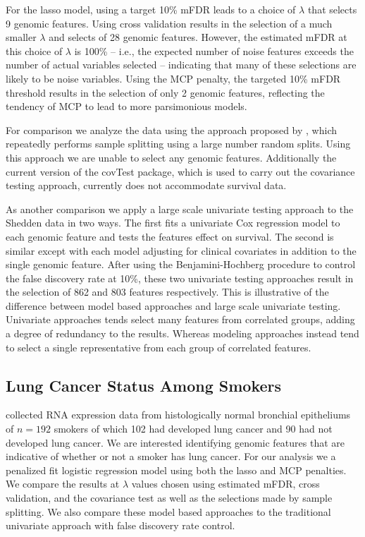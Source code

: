 For the lasso model, using a target 10\% mFDR leads to a choice of $\lambda$ that selects 9 genomic features. Using cross validation results in the selection of a much smaller $\lambda$ and selects of 28 genomic features.  However, the estimated mFDR at this choice of $\lambda$ is 100\% -- i.e., the expected number of noise features exceeds the number of actual variables selected -- indicating that many of these selections are likely to be noise variables.  Using the MCP penalty, the targeted 10\% mFDR threshold results in the selection of only 2 genomic features, reflecting the tendency of MCP to lead to more parsimonious models.


For comparison we analyze the data using the approach proposed by \citet{Meinshausen2009}, which repeatedly performs sample splitting using a large number random splits. Using this approach we are unable to select any genomic features. Additionally the current version of the covTest package, which is used to carry out the covariance testing approach, currently does not accommodate survival data.

As another comparison we apply a large scale univariate testing approach to the Shedden data in two ways. The first fits a univariate Cox regression model to each genomic feature and tests the features effect on survival.  The second is similar except with each model adjusting for clinical covariates in addition to the single genomic feature.  After using the Benjamini-Hochberg procedure to control the false discovery rate at 10\%, these two univariate testing approaches result in the selection of 862 and 803 features respectively. This is illustrative of the difference between model based approaches and large scale univariate testing. Univariate approaches tends select many features from correlated groups, adding a degree of redundancy to the results. Whereas modeling approaches instead tend to select a single representative from each group of correlated features.  

\subsection{Lung Cancer Status Among Smokers}

\citet{Spira2007} collected RNA expression data from histologically normal bronchial epitheliums of $n = 192$ smokers of which 102 had developed lung cancer and 90 had not developed lung cancer.  We are interested identifying genomic features that are indicative of whether or not a smoker has lung cancer.  For our analysis we a penalized fit logistic regression model using both the lasso and MCP penalties. We compare the results at $\lambda$ values chosen using estimated mFDR, cross validation, and the covariance test as well as the selections made by sample splitting. We also compare these model based approaches to the traditional univariate approach with false discovery rate control.

